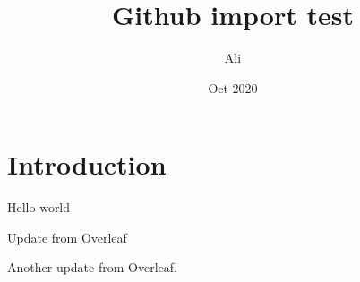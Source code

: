 \documentclass{article}
\title{Github import test}
\author{Ali}
\date{Oct 2020}
\begin{document}
\maketitle

\section{Introduction}

Hello world

Update from Overleaf

Another update from Overleaf.
\end{document}
